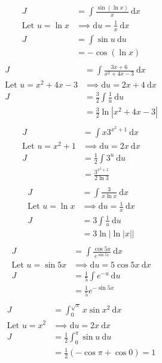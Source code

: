 \documentclass[a4paper,11pt]{article}
\theoremstyle{plain}
\theoremstyle{definition}
\begin{document}
\begin{align*}
	J&=\int \frac{\sin(\ln x)}{x}\ \text{d}x \\
	\text{Let } u = \ln x &\implies \text{d}u = \frac{1}{x}\ \text{d}x \\
	J&=\int \sin u\ \text{d}u \\
	 &=-\cos(\ln x) \\
\end{align*}
\begin{align*}
	J&=\int \frac{3x+6}{x^2+4x-3}\ \text{d}x \\
	\text{Let } u = x^2+4x-3 &\implies \text{d}u = 2x+4\ \text{d}x \\
	J&=\frac{3}{2}\int \frac{1}{u}\ \text{d}u \\
	 &=\frac{3}{2}\ln \left|x^2+4x-3\right| \\
\end{align*}
\begin{align*}
	J&=\int x 3^{x^2+1}\ \text{d}x \\
	\text{Let } u = x^2+1 &\implies \text{d}u = 2x\ \text{d}x \\
	J&=\frac{1}{2}\int 3^u\ \text{d}u \\
	 &=\frac{3^{x^2+1}}{2\ln 3} \\
\end{align*}
\begin{align*}
	J&=\int \frac{3}{x\ln x}\ \text{d}x \\
	\text{Let } u = \ln x &\implies \text{d}u = \frac{1}{x}\ \text{d}x \\
	J&=3\int \frac{1}{u}\ \text{d}u \\
	 &=3 \ln \left|\ln |x|\right| \\
\end{align*}
\begin{align*}
	J&=\int \frac{\cos 5x}{e^{\sin 5x}}\ \text{d}x \\
	\text{Let } u = \sin 5x &\implies \text{d}u = 5\cos 5x\ \text{d}x \\
	J&=\frac{1}{5}\int e^{-u}\ \text{d}u \\
	 &=\frac{1}{5} e^{-\sin 5x} \\
\end{align*}
\begin{align*}
	J&=\int_{0}^{\sqrt{\pi}} x\sin x^2\ \text{d}x \\
	\text{Let } u = x^2 &\implies \text{d}u = 2x\ \text{d}x \\
	J &= \frac{1}{2}\int_0^{\pi} \sin u\ \text{d}u \\
	  &= \frac{1}{2} (-\cos \pi + \cos 0) = 1
\end{align*}
\end{document}
